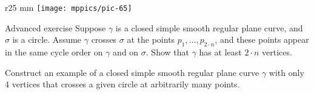 \begin{wrapfigure}[5]{r}{25 mm}
\vskip-7mm
\centering
\texttt{[image: mppics/pic-65]}
\vskip0mm
\end{wrapfigure}

\begin{thm}{Advanced exercise}\label{ex:curve-crosses-circle}
Suppose $\gamma$ is a closed simple smooth regular plane curve, and $\sigma$ is a circle.
Assume $\gamma$ crosses $\sigma$ at the points $p_1,\dots,p_{2{\cdot} n}$, and these points appear in the same cycle order on $\gamma$ and on $\sigma$.
Show that $\gamma$ has at least $2\cdot n$ vertices.

Construct an example of a closed simple smooth regular plane curve $\gamma$ with only 4 vertices that crosses a given circle at arbitrarily many points. 
\end{thm}
